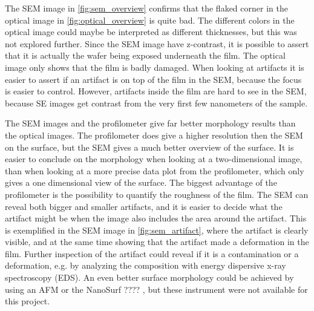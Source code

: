 The SEM image in \autoref{fig:sem_overview} confirms that the flaked corner in the optical image in \autoref{fig:optical_overview} is quite bad.
The different colors in the optical image could maybe be interpreted as different thicknesses, but this was not explored further.
Since the SEM image have z-contrast, it is possible to assert that it is actually the wafer being exposed underneath the film.
The optical image only shows that the film is badly damaged.
When looking at artifacts it is easier to assert if an artifact is on top of the film in the SEM, because the focus is easier to control.
However, artifacts inside the film are hard to see in the SEM, because SE images get contrast from the very first few nanometers of the sample.

The SEM images and the profilometer give far better morphology results than the optical images.
The profilometer does give a higher resolution then the SEM on the surface, but the SEM gives a much better overview of the surface.
It is easier to conclude on the morphology when looking at a two-dimensional image, than when looking at a more precise data plot from the profilometer, which only gives a one dimensional view of the surface.
The biggest advantage of the profilometer is the possibility to quantify the roughness of the film.
The SEM can reveal both bigger and smaller artifacts, and it is easier to decide what the artifact might be when the image also includes the area around the artifact.
This is exemplified in the SEM image in \autoref{fig:sem_artifact}, where the artifact is clearly visible, and at the same time showing that the artifact made a deformation in the film.
Further inspection of the artifact could reveal if it is a contamination or a deformation, e.g. by analyzing the composition with energy dispersive x-ray spectroscopy (EDS).
An even better surface morphology could be achieved by using an AFM or the NanoSurf ???? , but these instrument were not available for this project.